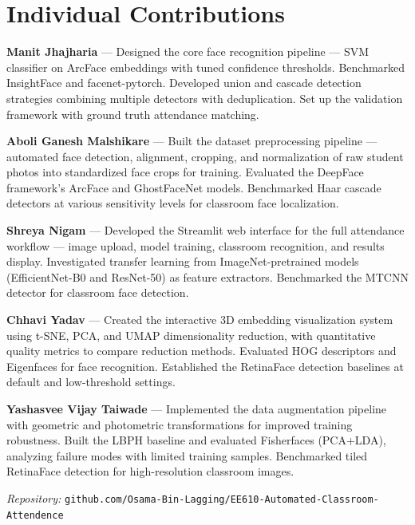 \documentclass[12pt,a4paper]{article}
\begin{document}
\section{Individual Contributions}

\textbf{Manit Jhajharia} --- Designed the core face recognition pipeline --- SVM classifier on ArcFace embeddings with tuned confidence thresholds. Benchmarked InsightFace and facenet-pytorch. Developed union and cascade detection strategies combining multiple detectors with deduplication. Set up the validation framework with ground truth attendance matching.

\textbf{Aboli Ganesh Malshikare} --- Built the dataset preprocessing pipeline --- automated face detection, alignment, cropping, and normalization of raw student photos into standardized face crops for training. Evaluated the DeepFace framework's ArcFace and GhostFaceNet models. Benchmarked Haar cascade detectors at various sensitivity levels for classroom face localization.

\textbf{Shreya Nigam} --- Developed the Streamlit web interface for the full attendance workflow --- image upload, model training, classroom recognition, and results display. Investigated transfer learning from ImageNet-pretrained models (EfficientNet-B0 and ResNet-50) as feature extractors. Benchmarked the MTCNN detector for classroom face detection.

\textbf{Chhavi Yadav} --- Created the interactive 3D embedding visualization system using t-SNE, PCA, and UMAP dimensionality reduction, with quantitative quality metrics to compare reduction methods. Evaluated HOG descriptors and Eigenfaces for face recognition. Established the RetinaFace detection baselines at default and low-threshold settings.

\textbf{Yashasvee Vijay Taiwade} --- Implemented the data augmentation pipeline with geometric and photometric transformations for improved training robustness. Built the LBPH baseline and evaluated Fisherfaces (PCA+LDA), analyzing failure modes with limited training samples. Benchmarked tiled RetinaFace detection for high-resolution classroom images.

\vfill
\noindent\textit{Repository:} \texttt{github.com/Osama-Bin-Lagging/EE610-Automated-Classroom-Attendence}
\end{document}
